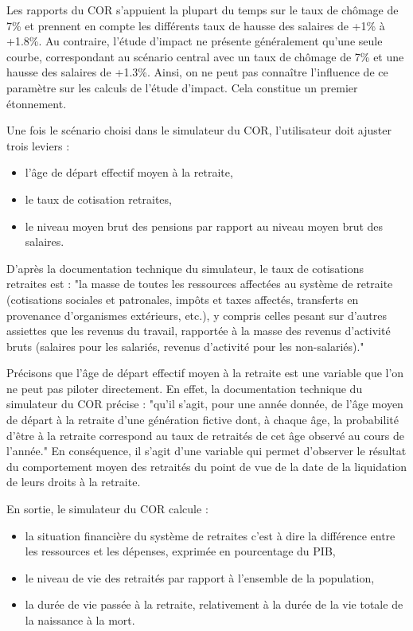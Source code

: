 \documentclass[10pt]{article}
\begin{document}
Les rapports du COR s'appuient la plupart du temps sur le taux 
de chômage de 7\% et prennent en compte les différents taux de hausse 
des salaires de +1\% à +1.8\%. 
Au contraire, l'étude d'impact ne présente généralement qu'une seule 
courbe, correspondant au scénario central avec un taux de chômage de 7\% et une hausse des 
salaires de +1.3\%. 
Ainsi, on ne peut pas connaître l'influence de ce paramètre sur les calculs 
de l'étude d'impact. 
Cela constitue un premier étonnement. 

Une fois le scénario choisi dans le simulateur du COR, 
l'utilisateur doit ajuster trois leviers : 
\begin{itemize}
\item l'âge de départ effectif moyen à la retraite, 
\item le taux de cotisation retraites, 
\item le niveau moyen brut des pensions par rapport au niveau moyen brut des salaires. 
\end{itemize}

D'après la documentation technique du simulateur, 
le taux de cotisations retraites est : "la masse de toutes les ressources affectées au système
de retraite (cotisations sociales et patronales, impôts et taxes affectés, transferts en provenance
d’organismes extérieurs, etc.), y compris celles pesant sur d’autres assiettes 
que les revenus du travail, rapportée à la masse des revenus d'activité bruts (salaires pour les salariés, revenus d’activité pour les non-salariés)." 

Précisons que l'âge de départ effectif moyen à la retraite est une variable que l'on ne peut pas 
piloter directement. 
En effet, la documentation technique du simulateur du COR précise : "qu'il s’agit, 
pour une année donnée, de l’âge moyen 
de départ à la retraite d’une génération fictive dont, à chaque âge, 
la probabilité d’être à la retraite correspond au taux de retraités de cet âge observé 
au cours de l’année." 
En conséquence, il s'agit d'une variable qui permet d'observer le résultat du comportement 
moyen des retraités du point de vue de la date de la liquidation de leurs droits à la 
retraite. 

En sortie, le simulateur du COR calcule :
\begin{itemize}
\item la situation financière du système de retraites c'est à dire la différence 
entre les ressources et les dépenses, exprimée en pourcentage du PIB, 
\item le niveau de vie des retraités par rapport à l’ensemble de la population, 
\item la durée de vie passée à la retraite, relativement à la durée de la vie totale 
de la naissance à la mort. 
\end{itemize}
\end{document}
